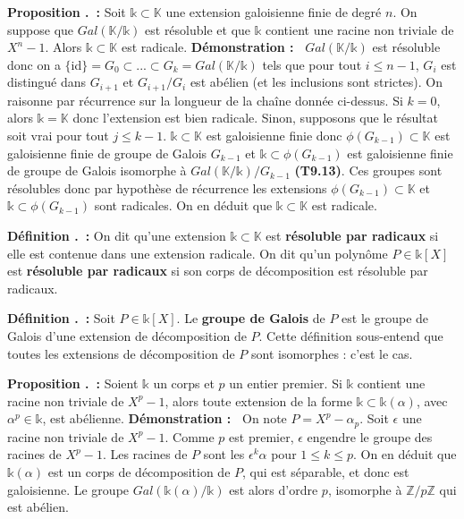 \documentclass[5pt,a4paper]{article}
\newcounter{prop}[section]
\newcounter{defin}[section]
\renewcommand{\theprop}{\thesection.\arabic{prop}}
\renewcommand{\thedefin}{\thesection.\arabic{defin}}
\newcommand{\prop}[1]{\stepcounter{prop}\noindent\textbf{Proposition \theprop ~:} #1 \newline}
\newcommand{\defin}[1]{\stepcounter{defin}\noindent\textbf{Définition \thedefin ~:} #1 \newline}
\newcommand{\demo}[1]{\textbf{Démonstration :~} #1 \newline}
\begin{document}
\begin{onehalfspacing}
\prop{Soit $\mathds{k} \subset \mathbb{K}$ une extension galoisienne finie de degré $n$. On suppose que $Gal(\mathbb{K}/\mathds{k})$ est résoluble et que $\mathds{k}$ contient une racine non triviale de $X^n - 1$. Alors $\mathds{k} \subset \mathbb{K}$ est radicale.}
\demo{$Gal(\mathbb{K}/\mathds{k})$ est résoluble donc on a $\{$id$\} = G_0 \subset ... \subset G_k = Gal(\mathbb{K}/\mathds{k})$ tels que pour tout $i \leq n-1$, $G_i$ est distingué dans $G_{i+1}$ et $G_{i+1}/G_i$ est abélien (et les inclusions sont strictes). On raisonne par récurrence sur la longueur de la chaîne donnée ci-dessus. Si $k = 0$, alors $\mathds{k} = \mathbb{K}$ donc l'extension est bien radicale. Sinon, supposons que le résultat soit vrai pour tout $j \leq k-1$. $\mathds{k} \subset \mathbb{K}$ est galoisienne finie donc $\phi(G_{k-1}) \subset \mathbb{K}$ est galoisienne finie de groupe de Galois $G_{k-1}$ et $\mathds{k} \subset \phi(G_{k-1})$ est galoisienne finie de groupe de Galois isomorphe à $Gal(\mathbb{K}/\mathds{k})/G_{k-1}$ \textbf{(T9.13)}. Ces groupes sont résolubles donc par hypothèse de récurrence les extensions $\phi(G_{k-1}) \subset \mathbb{K}$ et $\mathds{k} \subset \phi(G_{k-1})$ sont radicales. On en déduit que $\mathds{k} \subset \mathbb{K}$ est radicale.}


\defin{On dit qu'une extension $\mathds{k} \subset \mathbb{K}$ est \textbf{résoluble par radicaux} si elle est contenue dans une extension radicale. On dit qu'un polynôme $P \in \mathds{k}[X]$ est \textbf{résoluble par radicaux} si son corps de décomposition est résoluble par radicaux.}


\defin{Soit $P \in \mathds{k}[X]$. Le \textbf{groupe de Galois} de $P$ est le groupe de Galois d'une extension de décomposition de $P$. Cette définition sous-entend que toutes les extensions de décomposition de $P$ sont isomorphes : c'est le cas.}


\prop{Soient $\mathds{k}$ un corps et $p$ un entier premier. Si $\mathds{k}$ contient une racine non triviale de $X^p - 1$, alors toute extension de la forme $\mathds{k} \subset \mathds{k}(\alpha)$, avec $\alpha^p \in \mathds{k}$, est abélienne.}
\demo{On note $P = X^p - \alpha_p$. Soit $\epsilon$ une racine non triviale de $X^p - 1$. Comme $p$ est premier, $\epsilon$ engendre le groupe des racines de $X^p - 1$. Les racines de $P$ sont les $\epsilon^k\alpha$ pour $1 \leq k \leq p$. On en déduit que $\mathds{k}(\alpha)$ est un corps de décomposition de $P$, qui est séparable, et donc est galoisienne. Le groupe $Gal(\mathds{k}(\alpha)/\mathds{k})$ est alors d'ordre $p$, isomorphe à $\mathbb{Z}/p\mathbb{Z}$ qui est abélien.}



\end{onehalfspacing}
\end{document}
